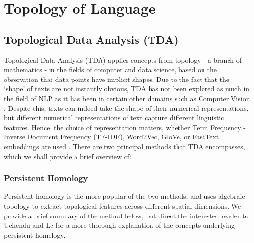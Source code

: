 \documentclass[12pt,twoside]{report}
\begin{document}
\section{Topology of Language}

\subsection{Topological Data Analysis (TDA)}

Topological Data Analysis (TDA) applies concepts from topology - a branch of mathematics - in the fields of computer and data science, based on the observation that data points have implicit shapes. \cite{savle-etal-2019-topological} Due to the fact that the `shape' of texts are not instantly obvious, TDA has not been explored as much in the field of NLP as it has been in certain other domains such as Computer Vision \cite{uchendu2024unveilingtopologicalstructurestext}. Despite this, texts can indeed take the shape of their numerical representations, but different numerical representations of text capture different linguistic features. Hence, the choice of representation matters, whether Term Frequency - Inverse Document Frequency (TF-IDF), Word2Vec, GloVe, or FastText embeddings are used \cite{uchendu2024unveilingtopologicalstructurestext}. There are two principal methods that TDA encompasses, which we shall provide a brief overview of:
\vspace{-10pt}
\subsubsection{Persistent Homology}
Persistent homology is the more popular of the two methods, and uses algebraic topology to extract topological features across different spatial dimensions. \cite{uchendu2024unveilingtopologicalstructurestext} We provide a brief summary of the method below, but direct the interested reader to Uchendu and Le \cite{uchendu2024unveilingtopologicalstructurestext} for a more thorough explanation of the concepts underlying persistent homology. \newline \par 
\end{document}
